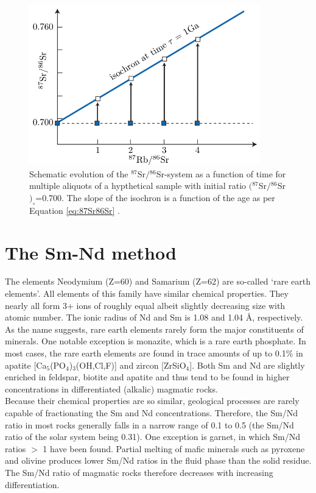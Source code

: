 \documentclass{book}
\newif\ifpdf
\begin{document}
\begin{figure}[!ht]
  \centering
  \ifpdf
  \def\svgwidth{.8\textwidth}
  
  \else
  \includegraphics[width=10cm]{isochron.png}
  \fi
  \caption{Schematic evolution of the $^{87}$Sr$/{}^{86}$Sr-system as
    a function of time for multiple aliquots of a hypthetical sample
    with initial ratio $({}^{87}$Sr$/{}^{86}$Sr$)_\circ$=0.700. The
    slope of the isochron is a function of the age as per Equation
    \ref{eq:87Sr86Sr} \citep[modified from][]{allegre2008}.}
  \label{fig:isochron}
\end{figure}

\section{The Sm-Nd method}
\label{sec:Sm-Nd}

The elements Neodymium (Z=60) and Samarium (Z=62) are so-called `rare
earth elements'.  All elements of this family have similar chemical
properties. They nearly all form 3+ ions of roughly equal albeit
slightly decreasing size with atomic number.  The ionic radius of Nd
and Sm is 1.08 and 1.04 \AA, respectively.  As the name suggests, rare
earth elements rarely form the major constituents of minerals.  One
notable exception is monazite, which is a rare earth phosphate. In
most cases, the rare earth elements are found in trace amounts of up
to 0.1\% in apatite [Ca$_5$(PO$_4$)$_3$(OH,Cl,F)] and zircon
[ZrSiO$_4$]. Both Sm and Nd are slightly enriched in feldspar, biotite
and apatite and thus tend to be found in higher concentrations in
differentiated (alkalic) magmatic rocks.\\

Because their chemical properties are so similar, geological processes
are rarely capable of fractionating the Sm and Nd
concentrations. Therefore, the Sm/Nd ratio in most rocks generally
falls in a narrow range of 0.1 to 0.5 (the Sm/Nd ratio of the solar
system being 0.31). One exception is garnet, in which Sm/Nd ratios $>$
1 have been found. Partial melting of mafic minerals such as pyroxene
and olivine produces lower Sm/Nd ratios in the fluid phase than the
solid residue.  The Sm/Nd ratio of magmatic rocks therefore decreases
with increasing differentiation.\\
\end{document}
